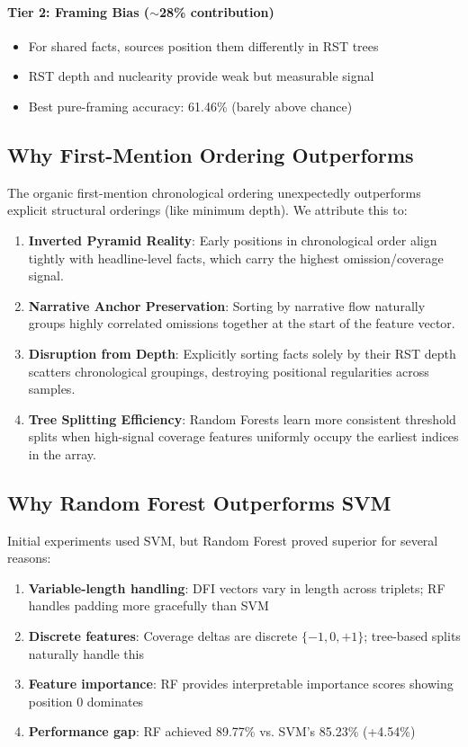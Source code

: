 \documentclass[11pt]{article}
\begin{document}
\paragraph{Tier 2: Framing Bias ($\sim$28\% contribution)}
\begin{itemize}
    \item For shared facts, sources position them differently in RST trees
    \item RST depth and nuclearity provide weak but measurable signal
    \item Best pure-framing accuracy: 61.46\% (barely above chance)
\end{itemize}

\subsection{Why First-Mention Ordering Outperforms}

The organic first-mention chronological ordering unexpectedly outperforms explicit structural orderings (like minimum depth). We attribute this to:
\begin{enumerate}
    \item \textbf{Inverted Pyramid Reality}: Early positions in chronological order align tightly with headline-level facts, which carry the highest omission/coverage signal.
    \item \textbf{Narrative Anchor Preservation}: Sorting by narrative flow naturally groups highly correlated omissions together at the start of the feature vector.
    \item \textbf{Disruption from Depth}: Explicitly sorting facts solely by their RST depth scatters chronological groupings, destroying positional regularities across samples.
    \item \textbf{Tree Splitting Efficiency}: Random Forests learn more consistent threshold splits when high-signal coverage features uniformly occupy the earliest indices in the array.
\end{enumerate}

\subsection{Why Random Forest Outperforms SVM}

Initial experiments used SVM, but Random Forest proved superior for several reasons:
\begin{enumerate}
    \item \textbf{Variable-length handling}: DFI vectors vary in length across triplets; RF handles padding more gracefully than SVM
    \item \textbf{Discrete features}: Coverage deltas are discrete $\{-1, 0, +1\}$; tree-based splits naturally handle this
    \item \textbf{Feature importance}: RF provides interpretable importance scores showing position 0 dominates
    \item \textbf{Performance gap}: RF achieved 89.77\% vs. SVM's 85.23\% (+4.54\%)
\end{enumerate}
\end{document}
